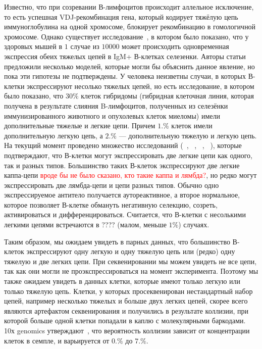 \documentclass{spbau-diploma}
\newcommand{\todo}{\textcolor{red}}
\begin{document}
Известно, что при созревании В-лимфоцитов происходит аллельное исключение, то есть успешная VDJ-рекомбинация гена, который кодирует тяжёлую цепь иммуноглобулина на одной хромосоме, блокирует  рекомбинацию в гомологичной хромосоме.
Однако существует исследование~\cite{barreto2000frequency}, в котором было показано, что у здоровых мышей в $1$ случае из $10000$ может происходить одновременная экспрессия обеих тяжелых цепей в IgM+ В-клетках селезенки.
Авторы статьи предложили несколько моделей, которые могли бы объяснить данное явление, но пока эти гипотезы не подтверждены.
У человека неизветны случаи, в которых В-клетки экспрессируют несолько тяжелых цепей, но есть исследование, в котором было показано, что $30\%$ клеток гибридомы (гибридная клеточная линия, которая получена в результате слияния B-лимфоцитов, полученных из селезёнки иммунизированного животного и опухолевых клеток миеломы) имели дополнительные тяжелые и легкие цепи.
Причем  $1.
\%$ клеток имели дополнительную легкую цепь, а $2.
\%$ --- дополнительную тяжелую и легкую цепь.
На текущий момент проведено множество исследований (~\cite{pelanda2014dual}, ~\cite{casellas2007igkappa}, ~\cite{liu2005receptor}, ~\cite{fraser2015immunoglobulin}), которые подтверждают, что В-клетки могут экспрессировать две легкие цепи как одного, так и разных типов.
Большинство таких В-клеток экспрессируют две легкие каппа-цепи \todo{вроде бы не было сказано, кто такие каппа и лямбда?}, но редко могут экспрессировать две лямбда-цепи и цепи разных типов.
Обычно одно экспрессируемое антитело получается аутореактивное, а второе нормальное, которое позволяет В-клетке обмануть негативную селекцию, созреть, активироваться и дифференцироваться.
Считается, что В-клетки  с несолькими легкими цепями встречаются в ???? (малом, меньше $1\%$) случаях.


Таким образом, мы ожидаем увидеть в парных данных, что большинство В-клеток экспрессируют одну легкую и одну тяжелую цепь или (редко) одну тяжелую и две легких цепи.
При секвенировании мы можем увидеть не все цепи, так как они могли не проэкспрессироваться на момент эксперимента.
Поэтому мы также ожидаем увидеть в данных клетки, которые имеют только легкую или только тяжелую цепь.
Клетки, у которых просеквенирован нестандартный набор цепей, например несколько тяжелых и больше двух легких цепей, скорее всего являются артефактом секвенирования и получились в результате коллизии, при которой больше одной клетки попадали в каплю с молекулярными баркодами.
10х genomics утверждают~\cite{10x_manual}, что вероятность коллизии зависит от концентрации клеток в семпле, и варьируется от $0.\%$ до $7.\%$.
\end{document}
